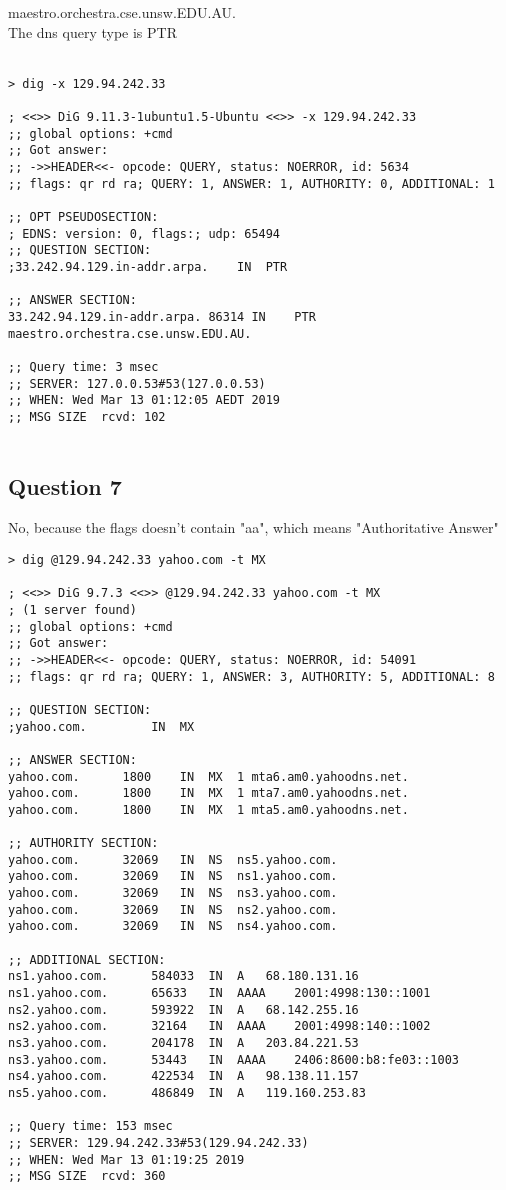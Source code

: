 \documentclass{article}
\begin{document}
maestro.orchestra.cse.unsw.EDU.AU. \\
The dns query type is PTR\\\\

\begin{lstlisting}
> dig -x 129.94.242.33       

; <<>> DiG 9.11.3-1ubuntu1.5-Ubuntu <<>> -x 129.94.242.33
;; global options: +cmd
;; Got answer:
;; ->>HEADER<<- opcode: QUERY, status: NOERROR, id: 5634
;; flags: qr rd ra; QUERY: 1, ANSWER: 1, AUTHORITY: 0, ADDITIONAL: 1

;; OPT PSEUDOSECTION:
; EDNS: version: 0, flags:; udp: 65494
;; QUESTION SECTION:
;33.242.94.129.in-addr.arpa.	IN	PTR

;; ANSWER SECTION:
33.242.94.129.in-addr.arpa. 86314 IN	PTR	maestro.orchestra.cse.unsw.EDU.AU.

;; Query time: 3 msec
;; SERVER: 127.0.0.53#53(127.0.0.53)
;; WHEN: Wed Mar 13 01:12:05 AEDT 2019
;; MSG SIZE  rcvd: 102


\end{lstlisting}
\subsection{Question 7}

No, because the flags doesn't contain "aa", which means "Authoritative Answer"

\begin{lstlisting}
> dig @129.94.242.33 yahoo.com -t MX

; <<>> DiG 9.7.3 <<>> @129.94.242.33 yahoo.com -t MX
; (1 server found)
;; global options: +cmd
;; Got answer:
;; ->>HEADER<<- opcode: QUERY, status: NOERROR, id: 54091
;; flags: qr rd ra; QUERY: 1, ANSWER: 3, AUTHORITY: 5, ADDITIONAL: 8

;; QUESTION SECTION:
;yahoo.com.			IN	MX

;; ANSWER SECTION:
yahoo.com.		1800	IN	MX	1 mta6.am0.yahoodns.net.
yahoo.com.		1800	IN	MX	1 mta7.am0.yahoodns.net.
yahoo.com.		1800	IN	MX	1 mta5.am0.yahoodns.net.

;; AUTHORITY SECTION:
yahoo.com.		32069	IN	NS	ns5.yahoo.com.
yahoo.com.		32069	IN	NS	ns1.yahoo.com.
yahoo.com.		32069	IN	NS	ns3.yahoo.com.
yahoo.com.		32069	IN	NS	ns2.yahoo.com.
yahoo.com.		32069	IN	NS	ns4.yahoo.com.

;; ADDITIONAL SECTION:
ns1.yahoo.com.		584033	IN	A	68.180.131.16
ns1.yahoo.com.		65633	IN	AAAA	2001:4998:130::1001
ns2.yahoo.com.		593922	IN	A	68.142.255.16
ns2.yahoo.com.		32164	IN	AAAA	2001:4998:140::1002
ns3.yahoo.com.		204178	IN	A	203.84.221.53
ns3.yahoo.com.		53443	IN	AAAA	2406:8600:b8:fe03::1003
ns4.yahoo.com.		422534	IN	A	98.138.11.157
ns5.yahoo.com.		486849	IN	A	119.160.253.83

;; Query time: 153 msec
;; SERVER: 129.94.242.33#53(129.94.242.33)
;; WHEN: Wed Mar 13 01:19:25 2019
;; MSG SIZE  rcvd: 360

\end{lstlisting}
\end{document}
